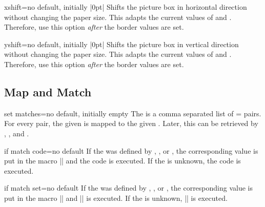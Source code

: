 \documentclass[a4paper,11pt]{ltxdoc}
\begin{document}
\begin{docIgrKey}[][doc new={2024-03-08}]{xshift}{=}{no default, initially |0pt|}
Shifts the picture box in horizontal direction without changing the paper size.
This adapts the current values of  and .
Therefore, use this option \emph{after} the border values are set.
\end{docIgrKey}

\begin{docIgrKey}[][doc new={2024-03-08}]{yshift}{=}{no default, initially |0pt|}
Shifts the picture box in vertical direction without changing the paper size.
This adapts the current values of  and .
Therefore, use this option \emph{after} the border values are set.
\end{docIgrKey}



\clearpage
\subsection{Map and Match}

\begin{docIgrKey}{set matches}{=}{no default, initially empty}
  The  is a comma separated list of = pairs.
  For every pair, the given  is mapped to the given .
  Later, this  can be retrieved by
  ,
  , and
  .

\begin{dispListing}
\end{dispListing}
\end{docIgrKey}
\tcbusetemp

\begin{docIgrKey}{if match code}{=}{no default}
  If the  was defined by ,
  , or ,
  the corresponding value is put in the
  macro |\igrmatchvalue| and the  code is
  executed. If the  is unknown, the  code is
  executed.
\end{docIgrKey}

\begin{docIgrKey}{if match set}{=}{no default}
  If the  was defined by ,
  , or ,
  the corresponding value is put in the
  macro |\igrmatchvalue| and || is executed.
  If the  is unknown, || is executed.
\end{docIgrKey}
\end{document}
